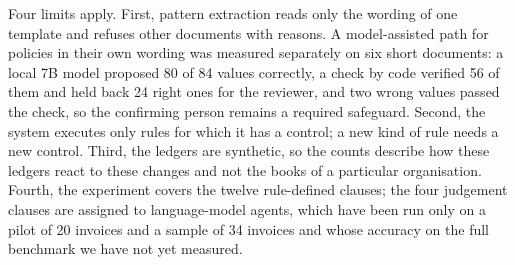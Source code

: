 \documentclass[conference]{IEEEtran}
\begin{document}
Four limits apply. First, pattern extraction reads only the wording of one template and refuses other documents with reasons. A model-assisted path for policies in their own wording was measured separately on six short documents: a local 7B model proposed 80 of 84 values correctly, a check by code verified 56 of them and held back 24 right ones for the reviewer, and two wrong values passed the check, so the confirming person remains a required safeguard. Second, the system executes only rules for which it has a control; a new kind of rule needs a new control. Third, the ledgers are synthetic, so the counts describe how these ledgers react to these changes and not the books of a particular organisation. Fourth, the experiment covers the twelve rule-defined clauses; the four judgement clauses are assigned to language-model agents, which have been run only on a pilot of 20 invoices and a sample of 34 invoices and whose accuracy on the full benchmark we have not yet measured.
\end{document}
